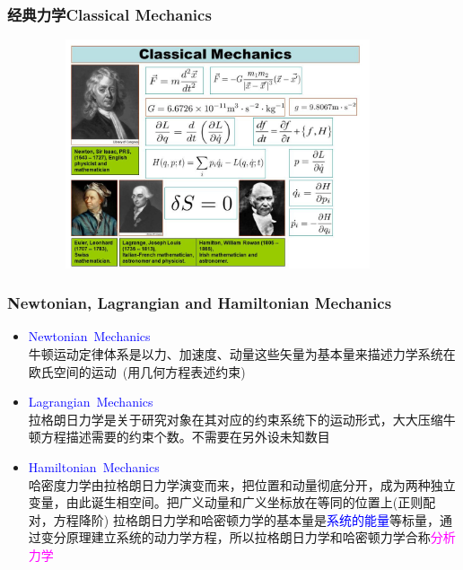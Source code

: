 \frame
{
	\frametitle{经典力学\textrm{Classical Mechanics}}
\begin{figure}[h!]
\vspace*{-0.18in}
\centering
\includegraphics[height=2.65in,width=4.05in,viewport=0 0 715 495,clip]{Figures/Classical_Mechanics.jpg}
\label{Classical_Mechanics}
\end{figure}
}

\frame
{
	\frametitle{\textrm{\small Newtonian, Lagrangian and Hamiltonian Mechanics}}
	\begin{itemize}
   		\setlength{\itemsep}{10pt}
		\item \textrm{\textcolor{blue}{Newtonian~Mechanics}}\\
		牛顿运动定律体系是以力、加速度、动量这些矢量为基本量来描述力学系统在欧氏空间的运动~(用几何方程表述约束)
	\item \textrm{\textcolor{blue}{Lagrangian~Mechanics}}\\
		拉格朗日力学是关于研究对象在其对应的约束系统下的运动形式，大大压缩牛顿方程描述需要的约束个数。不需要在另外设未知数目
	\item \textrm{\textcolor{blue}{Hamiltonian~Mechanics}}\\
		哈密度力学由拉格朗日力学演变而来，把位置和动量彻底分开，成为两种独立变量，由此诞生相空间。把广义动量和广义坐标放在等同的位置上(正则配对，方程降阶)
		\vskip 6pt
		拉格朗日力学和哈密顿力学的基本量是\textcolor{blue}{系统的能量}等标量，通过变分原理建立系统的动力学方程，所以拉格朗日力学和哈密顿力学合称\textcolor{magenta}{分析力学}
	\end{itemize}
}

